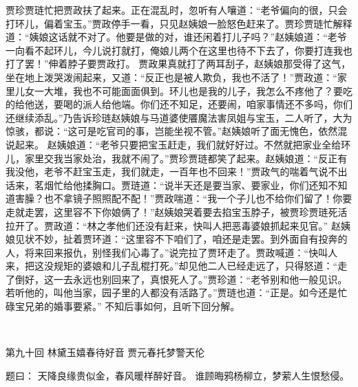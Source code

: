 \documentclass[12pt,oneside]{book}
\begin{document}
贾珍贾琏忙把贾政扶了起来。正在混乱时，忽听有人嚷道：“老爷偏向的很，只会打环儿，偏着宝玉。”贾政停手一看，只见赵姨娘一脸怒色赶来了。贾珍贾琏忙解释道：“姨娘这话就不对了。他要是做的对，谁还闲着打儿子吗？”赵姨娘道：“老爷一向看不起环儿，今儿说打就打，俺娘儿两个在这里也待不下去了，你要打连我也打了罢！”伸着脖子要贾政打。
贾政果真就打了两耳刮子，赵姨娘那受得了这气，坐在地上泼哭泼闹起来，又道：“反正也是被人欺负，我也不活了！”贾政道：“家里儿女一大堆，我也不可能面面俱到。环儿也是我的儿子，我怎么不疼他了？要吃的给他送，要喝的派人给他端。你们还不知足，还要闹，咱家事情还不多吗，你们还继续添乱。”乃告诉珍琏赵姨娘与马道婆使餍魔法害凤姐与宝玉，二人听了，大为惊骇，都说：“这可是吃官司的事，岂能坐视不管。”赵姨娘听了面无愧色，依然混说起来。
赵姨娘道：“老爷只要把宝玉赶走，我们就好好过。不然就把家业全给环儿，家里交我当家处治，我就不闹了。”贾珍贾琏都笑了起来。赵姨娘道：“反正有我没他，老爷不赶宝玉走，我们就走，一百年也不回来！”贾政气的喘着气说不出话来，茗烟忙给他揉胸口。贾琏道：“说半天还是要当家、要家业，你们还知不知道害臊？也不拿镜子照照配不配！”贾政喘道：“我一个子儿也不给你们留了！你要走就走罢，这里容不下你娘俩了！”赵姨娘哭着要去掐宝玉脖子，被贾珍贾琏死活拉开了。贾政道：“林之孝他们还没有赶来，快叫人把恶毒婆娘抓起来见官。”
赵姨娘见状不妙，扯着贾环道：“这里容不下咱们了，咱还是走罢。到外面自有投奔的人，将来回来报仇，别怪我们心毒了。”说完拉了贾环走了。贾政喊道：“快叫人来，把这没规矩的婆娘和儿子乱棍打死。”却见他二人已经走远了，只得怒道：“走了倒好，这一去永远也别回来了，真恨死人了。”贾珍道：“老爷别和他一般见识。若听他的，叫他当家，园子里的人都没有活路了。”贾琏也道：“正是。如今还是忙碌宝兄弟的婚事要紧。”
不知后事如何，且听下回分解。

 
 
第九十回 林黛玉嬉春待好音 贾元春托梦警天伦

题曰：
天降良缘贵似金，春风暖样醉好音。
谁顾晦鸦杨柳立，梦萦人生恨愁侵。
\end{document}
